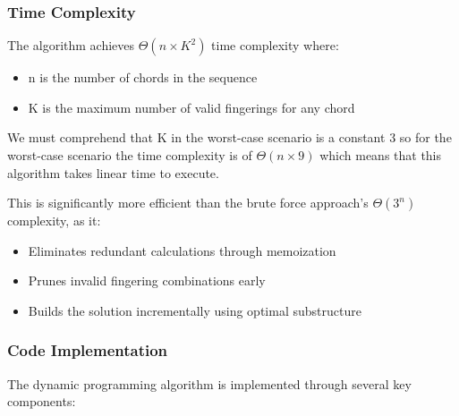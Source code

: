 \documentclass[conference]{IEEEtran}
\begin{document}
\subsubsection{Time Complexity}
The algorithm achieves \(\Theta(n \times K^2)\) time complexity where:
\begin{itemize}
    \item n is the number of chords in the sequence
    \item K is the maximum number of valid fingerings for any chord
\end{itemize}

We must comprehend that K in the worst-case scenario is a constant $3$ so for the worst-case scenario the time complexity is of \(\Theta(n \times 9) \) which means that this algorithm takes linear time to execute.

This is significantly more efficient than the brute force approach's \(\Theta(3^n)\) complexity, as it:
\begin{itemize}
    \item Eliminates redundant calculations through memoization
    \item Prunes invalid fingering combinations early
    \item Builds the solution incrementally using optimal substructure
\end{itemize}

\subsubsection{Code Implementation}
The dynamic programming algorithm is implemented through several key components:
\end{document}
